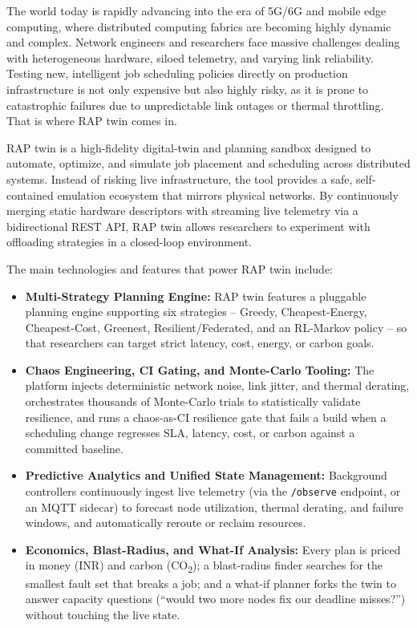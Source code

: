 \documentclass[12pt,a4]{report}
\begin{document}
The world today is rapidly advancing into the era of 5G/6G and mobile edge computing, where distributed computing fabrics are becoming highly dynamic and complex. Network engineers and researchers face massive challenges dealing with heterogeneous hardware, siloed telemetry, and varying link reliability. Testing new, intelligent job scheduling policies directly on production infrastructure is not only expensive but also highly risky, as it is prone to catastrophic failures due to unpredictable link outages or thermal throttling. That is where RAP twin comes in.

RAP twin is a high-fidelity digital-twin and planning sandbox designed to automate, optimize, and simulate job placement and scheduling across distributed systems. Instead of risking live infrastructure, the tool provides a safe, self-contained emulation ecosystem that mirrors physical networks. By continuously merging static hardware descriptors with streaming live telemetry via a bidirectional REST API, RAP twin allows researchers to experiment with offloading strategies in a closed-loop environment.

The main technologies and features that power RAP twin include:

\begin{itemize}
    \item \textbf{Multi-Strategy Planning Engine:} RAP twin features a pluggable planning engine supporting six strategies -- Greedy, Cheapest-Energy, Cheapest-Cost, Greenest, Resilient/Federated, and an RL-Markov policy -- so that researchers can target strict latency, cost, energy, or carbon goals.
    \item \textbf{Chaos Engineering, CI Gating, and Monte-Carlo Tooling:} The platform injects deterministic network noise, link jitter, and thermal derating, orchestrates thousands of Monte-Carlo trials to statistically validate resilience, and runs a chaos-as-CI resilience gate that fails a build when a scheduling change regresses SLA, latency, cost, or carbon against a committed baseline.
    \item \textbf{Predictive Analytics and Unified State Management:} Background controllers continuously ingest live telemetry (via the \texttt{/observe} endpoint, or an MQTT sidecar) to forecast node utilization, thermal derating, and failure windows, and automatically reroute or reclaim resources.
    \item \textbf{Economics, Blast-Radius, and What-If Analysis:} Every plan is priced in money (INR) and carbon (CO\textsubscript{2}); a blast-radius finder searches for the smallest fault set that breaks a job; and a what-if planner forks the twin to answer capacity questions (``would two more nodes fix our deadline misses?'') without touching the live state.
\end{itemize}
\end{document}
